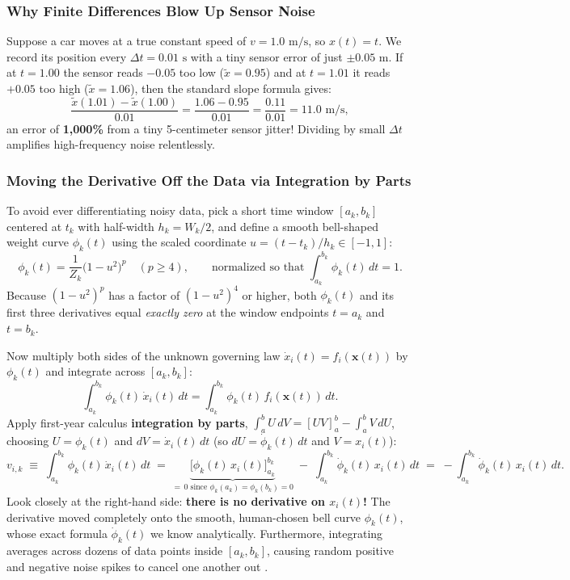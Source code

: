 \documentclass[11pt,a4paper]{article}
\begin{document}
\subsubsection{Why Finite Differences Blow Up Sensor Noise}
Suppose a car moves at a true constant speed of $v = 1.0\text{ m/s}$, so $x(t) = t$. We record its position every $\Delta t = 0.01\text{ s}$ with a tiny sensor error of just $\pm 0.05\text{ m}$. If at $t = 1.00$ the sensor reads $-0.05$ too low ($\tilde{x} = 0.95$) and at $t = 1.01$ it reads $+0.05$ too high ($\tilde{x} = 1.06$), then the standard slope formula gives:
\begin{equation}
  \frac{\tilde{x}(1.01) - \tilde{x}(1.00)}{0.01} = \frac{1.06 - 0.95}{0.01} = \frac{0.11}{0.01} = 11.0\text{ m/s},
\end{equation}
an error of \textbf{1,000\%} from a tiny 5-centimeter sensor jitter! Dividing by small $\Delta t$ amplifies high-frequency noise relentlessly.

\subsubsection{Moving the Derivative Off the Data via Integration by Parts}
To avoid ever differentiating noisy data, pick a short time window $[a_k, b_k]$ centered at $t_k$ with half-width $h_k = W_k/2$, and define a smooth bell-shaped weight curve $\phi_k(t)$ using the scaled coordinate $u = (t - t_k)/h_k \in [-1, 1]$:
\begin{equation}
  \phi_k(t) = \frac{1}{Z_k}\big(1 - u^2\big)^p \quad (p \ge 4), \qquad \text{normalized so that } \int_{a_k}^{b_k} \phi_k(t)\,dt = 1.
\end{equation}
Because $(1 - u^2)^p$ has a factor of $(1-u^2)^4$ or higher, both $\phi_k(t)$ and its first three derivatives equal \emph{exactly zero} at the window endpoints $t = a_k$ and $t = b_k$.

Now multiply both sides of the unknown governing law $\dot{x}_i(t) = f_i(\mathbf{x}(t))$ by $\phi_k(t)$ and integrate across $[a_k, b_k]$:
\begin{equation}
  \int_{a_k}^{b_k} \phi_k(t)\,\dot{x}_i(t)\,dt = \int_{a_k}^{b_k} \phi_k(t)\,f_i(\mathbf{x}(t))\,dt.
\end{equation}
Apply first-year calculus \textbf{integration by parts}, $\int_a^b U\,dV = [UV]_a^b - \int_a^b V\,dU$, choosing $U = \phi_k(t)$ and $dV = \dot{x}_i(t)\,dt$ (so $dU = \dot{\phi}_k(t)\,dt$ and $V = x_i(t)$):
\begin{equation}
  v_{i,k} \;\equiv\; \int_{a_k}^{b_k} \phi_k(t)\,\dot{x}_i(t)\,dt
  \;=\; \underbrace{\big[\phi_k(t)\,x_i(t)\big]_{a_k}^{b_k}}_{=\,0\text{ since }\phi_k(a_k)=\phi_k(b_k)=0}
  \;-\; \int_{a_k}^{b_k} \dot{\phi}_k(t)\,x_i(t)\,dt
  \;=\; -\int_{a_k}^{b_k} \dot{\phi}_k(t)\,x_i(t)\,dt.
\end{equation}
Look closely at the right-hand side: \textbf{there is no derivative on $x_i(t)$!} The derivative moved completely onto the smooth, human-chosen bell curve $\phi_k(t)$, whose exact formula $\dot{\phi}_k(t)$ we know analytically. Furthermore, integrating averages across dozens of data points inside $[a_k, b_k]$, causing random positive and negative noise spikes to cancel one another out \cite{messenger2021weak}.
\end{document}

